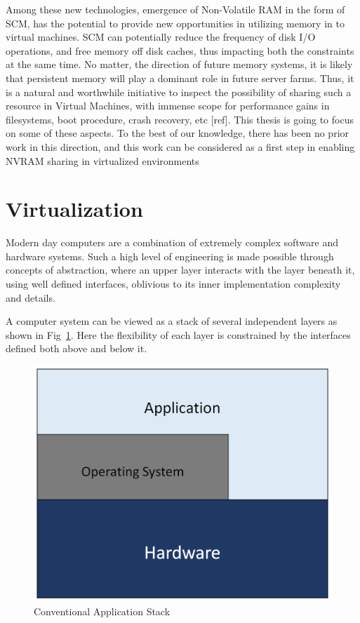 Among these new technologies, emergence of Non-Volatile RAM in the form of SCM, has the potential to provide new opportunities in utilizing memory in to virtual machines. SCM can potentially  reduce the frequency of disk I/O operations, and free memory off disk caches, thus impacting both the constraints at the same time. No matter, the direction of future memory systems, it is likely  that persistent memory will play a dominant role in future server farms. Thus, it is a natural and worthwhile initiative to inspect the possibility of sharing such a resource in Virtual Machines, with immense scope for  performance gains in filesystems, boot procedure, crash recovery, etc [ref]. This  thesis is going to focus on some of these aspects. To the best of our  knowledge, there has been no prior work in this direction, and this work can be considered as a first step in enabling NVRAM sharing in virtualized environments

\section{Virtualization}
Modern day computers are a combination of extremely complex software and hardware systems. Such a high level of engineering is made possible through concepts of abstraction, where an upper layer interacts with the layer beneath it, using well defined interfaces, oblivious to its inner implementation complexity and details.

A computer system can be viewed as a stack of several independent layers as shown in Fig~\ref{fig:appstack}. Here the flexibility of each layer is constrained by the interfaces defined both above and below it. 

\setlength{\belowcaptionskip}{-10pt}

\begin{figure}[H]
  \centering
  \includegraphics[scale=0.6]{figures/app_stack.png}
  \caption{Conventional Application Stack}
  \label{fig:appstack}
\end{figure}


